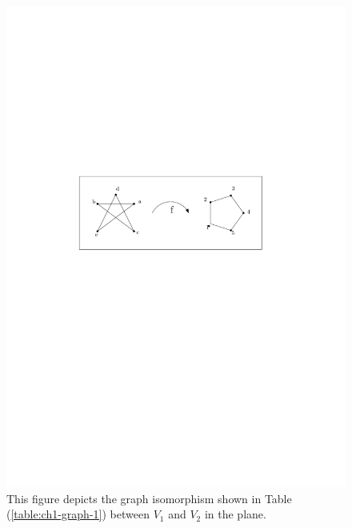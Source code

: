 \begin{figure}[!h]
\begin{center}
\includegraphics[scale=1]{graphics/graphIsomorphismExample.pdf}
\end{center} 
\caption{This figure depicts the graph isomorphism shown in Table 
(\ref{table:ch1-graph-1}) between 
$V_1$ and $V_2$ in the plane.}
\label{fig:configuration-3}
\end{figure}


